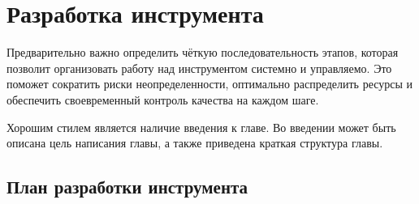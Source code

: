 \chapter{Разработка инструмента} \label{ch3}

Предварительно важно определить чёткую последовательность этапов,
которая позволит организовать работу над инструментом системно и управляемо.
Это поможет сократить риски неопределенности, оптимально распределить ресурсы и обеспечить своевременный контроль качества на каждом шаге.

Хорошим стилем является наличие введения к главе. Во введении может быть описана цель написания главы, а также приведена краткая структура главы.

\section{План разработки инструмента} \label{ch3:plan_debeloping}
